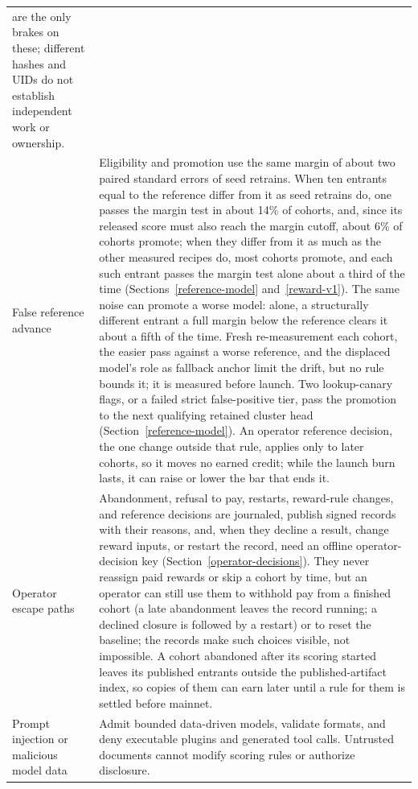 \begin{longtable}{@{}>{\raggedright\arraybackslash}p{}>{\raggedright\arraybackslash}p{}@{}}
are the only brakes on these; different hashes and UIDs do not establish
independent work or ownership. \\
False reference advance & Eligibility and promotion use the same margin of
about two paired standard errors of seed retrains. When ten entrants equal to
the reference differ from it as seed retrains do, one passes the margin test
in about 14\% of cohorts, and, since its released score must also reach the
margin cutoff, about 6\% of cohorts promote; when they differ from it as much
as the other measured recipes do, most cohorts promote, and each such entrant
passes the margin test alone about a third of the time
(Sections~\ref{reference-model} and~\ref{reward-v1}). The
same noise can promote a worse model: alone, a structurally different entrant a
full margin below the reference clears it about a fifth of the time. Fresh
re-measurement each cohort, the easier pass against a worse reference, and the
displaced model's role as fallback anchor limit the drift, but no rule bounds
it; it is measured before launch. Two lookup-canary flags, or a failed strict false-positive
tier, pass the promotion to the next qualifying retained cluster head
(Section~\ref{reference-model}). An operator reference decision, the one
change outside that rule, applies only to later cohorts, so it moves no earned
credit; while the launch burn lasts, it can raise or lower the bar that ends
it. \\
Operator escape paths & Abandonment, refusal to pay, restarts, reward-rule
changes, and reference decisions are journaled, publish signed records with
their reasons, and, when they decline a result, change reward inputs, or
restart the record, need an offline operator-decision key
(Section~\ref{operator-decisions}). They never reassign paid rewards or skip a
cohort by time, but an operator can still use them to withhold pay from a
finished cohort (a late abandonment leaves the record running; a declined
closure is followed by a restart) or to reset the baseline; the records make
such choices visible, not impossible. A cohort abandoned after its scoring
started leaves its published entrants outside the published-artifact index, so
copies of them can earn later until a rule for them is settled before mainnet. \\
Prompt injection or malicious model data & Admit bounded data-driven models,
validate formats, and deny executable plugins and generated tool calls.
Untrusted documents cannot modify scoring rules or authorize disclosure. \\

\end{longtable}
